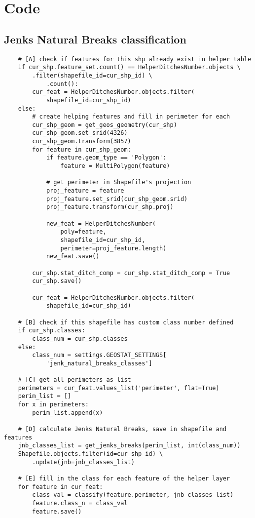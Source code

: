 \chapter{Code}
\label{app:code}

\section{Jenks Natural Breaks classification}
\label{sec:code-jenks}

    \begin{lstlisting}
    # [A] check if features for this shp already exist in helper table
    if cur_shp.feature_set.count() == HelperDitchesNumber.objects \
        .filter(shapefile_id=cur_shp_id) \
            .count():
        cur_feat = HelperDitchesNumber.objects.filter(
            shapefile_id=cur_shp_id)
    else:
        # create helping features and fill in perimeter for each
        cur_shp_geom = get_geos_geometry(cur_shp)
        cur_shp_geom.set_srid(4326)
        cur_shp_geom.transform(3857)
        for feature in cur_shp_geom:
            if feature.geom_type == 'Polygon':
                feature = MultiPolygon(feature)

            # get perimeter in Shapefile's projection
            proj_feature = feature
            proj_feature.set_srid(cur_shp_geom.srid)
            proj_feature.transform(cur_shp.proj)

            new_feat = HelperDitchesNumber(
                poly=feature,
                shapefile_id=cur_shp_id,
                perimeter=proj_feature.length)
            new_feat.save()

        cur_shp.stat_ditch_comp = cur_shp.stat_ditch_comp = True
        cur_shp.save()

        cur_feat = HelperDitchesNumber.objects.filter(
            shapefile_id=cur_shp_id)

    # [B] check if this shapefile has custom class number defined
    if cur_shp.classes:
        class_num = cur_shp.classes
    else:
        class_num = settings.GEOSTAT_SETTINGS[
            'jenk_natural_breaks_classes']

    # [C] get all perimeters as list
    perimeters = cur_feat.values_list('perimeter', flat=True)
    perim_list = []
    for x in perimeters:
        perim_list.append(x)

    # [D] calculate Jenks Natural Breaks, save in shapefile and features
    jnb_classes_list = get_jenks_breaks(perim_list, int(class_num))
    Shapefile.objects.filter(id=cur_shp_id) \
        .update(jnb=jnb_classes_list)

    # [E] fill in the class for each feature of the helper layer
    for feature in cur_feat:
        class_val = classify(feature.perimeter, jnb_classes_list)
        feature.class_n = class_val
        feature.save()
    \end{lstlisting}

